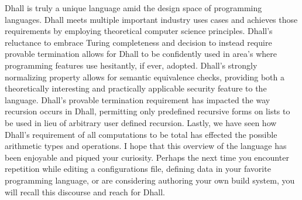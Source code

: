 \documentclass[12pt]{diazessay}
\begin{document}
Dhall is truly a unique language amid the design space of programming languages.
Dhall meets multiple important industry uses cases and achieves those requirements by employing theoretical computer science principles.
Dhall's reluctance to embrace Turing completeness and decision to instead require provable termination allows for Dhall to be confidently used in area's where programming features use hesitantly, if ever, adopted.
Dhall's strongly normalizing property allows for semantic equivalence checks, providing both a theoretically interesting and practically applicable security feature to the language.
Dhall's provable termination requirement has impacted the way recursion occurs in Dhall, permitting only predefined recursive forms on lists to be used in lieu of arbitrary user defined recursion.
Lastly, we have seen how Dhall's requirement of all computations to be total has effected the possible arithmetic types and operations.
I hope that this overview of the language has been enjoyable and piqued your curiosity.
Perhaps the next time you encounter repetition while editing a configurations file, defining data in your favorite programming language, or are considering authoring your own build system, you will recall this discourse and reach for Dhall.


\pagebreak



\end{document}
